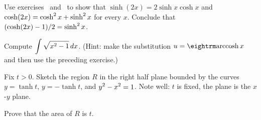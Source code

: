 \exercise Use exercises~ and~ to
show that $\sinh(2x)=2\sinh x \cosh x$ and $\displaystyle \cosh(2x)=\cosh^2 x
+\sinh^2 x$ for every $x$.  Conclude that $\displaystyle (\cosh (2x) -1)/2 = \sinh
^2 x$.
\endexercise

\exercise
Compute $\displaystyle \int \sqrt{x^2 -1}\,dx$. (Hint: make the substitution
$u=\arccosh x$ and then use the preceding exercise.)
\endexercise

\exercise  Fix $t>0$.
  Sketch the region $R$ in the right half plane bounded by the curves 
$y=\tanh t$, $y=-\tanh t$,  and $\displaystyle y^2-x^2 =1$. Note well: $t$ is fixed,
the plane is the $x$-$y$ plane.
\endexercise

\exercise Prove that the area of $R$ is $t$.
\endexercise
\filatetranscendentals

\endexercises
